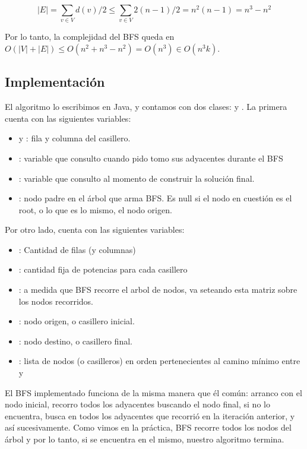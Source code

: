 \begin{equation*}
 |E| = \sum_{v \in V} d(v) / 2 \leq \sum_{v \in V} 2(n-1) / 2 = n^2 (n-1) = n^3 - n^2
\end{equation*}

Por lo tanto, la complejidad del BFS queda en $O(|V| + |E|) \leq O(n^2 + n^3 - n^2) = O(n^3) \in O(n^3 k)$. 

\subsection{Implementaci\'on}

El algoritmo lo escribimos en Java, y contamos con dos clases:  y . La primera cuenta con las siguientes variables: 

\begin{itemize}
 \item {} y : fila y columna del casillero.
 \item {}: variable que consulto cuando pido tomo sus adyacentes durante el BFS
 \item {}: variable que consulto al momento de construir la soluci\'on final. 
 \item {}: nodo padre en el \'arbol que arma BFS. Es null si el nodo en cuesti\'on es el root, o lo que es lo mismo, el nodo origen. 
\end{itemize}

Por otro lado,  cuenta con las siguientes variables: 

\begin{itemize}
 \item {}: Cantidad de filas (y columnas)
 \item {}: cantidad fija de potencias para cada casillero
 \item {}: a medida que BFS recorre el arbol de nodos, va seteando esta matriz sobre los nodos recorridos. 
 \item {}: nodo origen, o casillero inicial. 
 \item {}: nodo destino, o casillero final. 
 \item {}: lista de nodos (o casilleros) en orden pertenecientes al camino m\'inimo entre  y 
\end{itemize}

El BFS implementado funciona de la misma manera que \'el com\'un: arranco con el nodo inicial, recorro todos los adyacentes buscando el nodo final, si no lo encuentra, busca en todos los adyacentes que recorri\'o en la iteraci\'on anterior, y as\'i sucesivamente. Como vimos en la pr\'actica, BFS recorre todos los nodos del \'arbol y por lo tanto, si  se encuentra en el mismo, nuestro algoritmo termina. 

